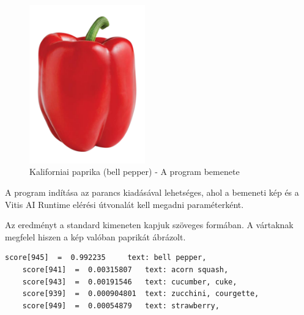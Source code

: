 \begin{figure}[!ht]
    \centering
    \includegraphics[width=50mm, keepaspectratio]{figures/bellpepper.png}
    \caption{Kaliforniai paprika (bell pepper) - A program bemenete}
\end{figure}

A program indítása az  parancs kiadásával lehetséges, ahol a bemeneti kép és a Vitis AI Runtime elérési útvonalát kell megadni paraméterként.

Az eredményt a standard kimeneten kapjuk szöveges formában. A vártaknak megfelel hiszen a kép valóban paprikát ábrázolt.

\begin{lstlisting}[frame=single,float=!ht]
    score[945]  =  0.992235     text: bell pepper,
    score[941]  =  0.00315807   text: acorn squash,
    score[943]  =  0.00191546   text: cucumber, cuke,
    score[939]  =  0.000904801  text: zucchini, courgette,
    score[949]  =  0.00054879   text: strawberry,
\end{lstlisting}
